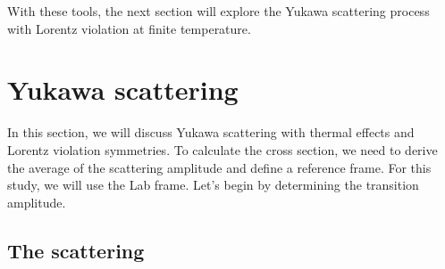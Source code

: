 \documentclass[11pt,showpacs,preprintnumbers,amsmath,amssymb,prd,nofootinbib,superscriptaddress]{revtex4-2}
\begin{document}
With these tools, the next section will explore the Yukawa scattering process with Lorentz violation at finite temperature.

\section{Yukawa scattering}\label{secscattering}

In this section, we will discuss Yukawa scattering with thermal effects and Lorentz violation symmetries. To calculate the cross section, we need to derive the average of the scattering amplitude and define a reference frame. For this study, we will use the Lab frame. Let's begin by determining the transition amplitude.


\subsection{The scattering}\label{secdiagram}
\end{document}
